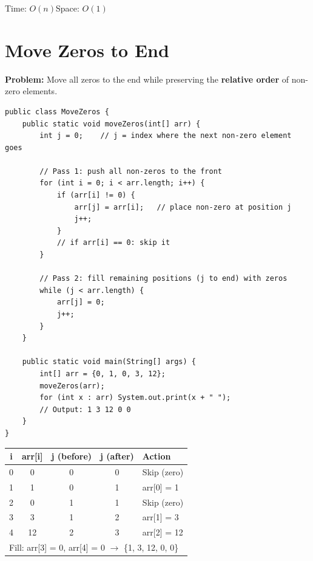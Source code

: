 \documentclass[12pt,a4paper,oneside]{book}
\begin{document}
\begin{complexity}
Time: $O(n)$\quad Space: $O(1)$
\end{complexity}

\section{Move Zeros to End}

\textbf{Problem:} Move all zeros to the end while preserving the \textbf{relative order} of non-zero elements.

\begin{lstlisting}[caption={Move Zeros to End --- Two Pointer, O(n) O(1)}]
public class MoveZeros {
    public static void moveZeros(int[] arr) {
        int j = 0;    // j = index where the next non-zero element goes

        // Pass 1: push all non-zeros to the front
        for (int i = 0; i < arr.length; i++) {
            if (arr[i] != 0) {
                arr[j] = arr[i];   // place non-zero at position j
                j++;
            }
            // if arr[i] == 0: skip it
        }

        // Pass 2: fill remaining positions (j to end) with zeros
        while (j < arr.length) {
            arr[j] = 0;
            j++;
        }
    }

    public static void main(String[] args) {
        int[] arr = {0, 1, 0, 3, 12};
        moveZeros(arr);
        for (int x : arr) System.out.print(x + " ");
        // Output: 1 3 12 0 0
    }
}
\end{lstlisting}

\begin{dryrun}[Dry Run: arr = \{0, 1, 0, 3, 12\}]
\begin{center}
\begin{tabular}{ccccl}
\toprule
\textbf{i} & \textbf{arr[i]} & \textbf{j (before)} & \textbf{j (after)} & \textbf{Action}\\
\midrule
0 & 0  & 0 & 0 & Skip (zero)\\
1 & 1  & 0 & 1 & arr[0] = 1\\
2 & 0  & 1 & 1 & Skip (zero)\\
3 & 3  & 1 & 2 & arr[1] = 3\\
4 & 12 & 2 & 3 & arr[2] = 12\\
\midrule
\multicolumn{5}{l}{Fill: arr[3] = 0, arr[4] = 0 $\to$ \{1, 3, 12, 0, 0\}}\\
\bottomrule
\end{tabular}
\end{center}
\end{dryrun}
\end{document}
